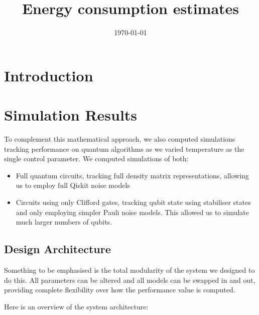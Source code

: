 \documentclass[showpacs,amsmath,amssymb,twocolumn,superscriptaddress,notitlepage,preprintnumbers,pra]{revtex4-1}
\begin{document}
\title{Energy consumption estimates}


\date{\today}







\begin{abstract}



\end{abstract}

\maketitle



\section{Introduction}

\section{Simulation Results}

To complement this mathematical approach, we also computed simulations tracking performance on quantum algorithms as we varied temperature as the single control parameter. We computed simulations of both:
\begin{itemize}[itemsep=1pt]
	\item Full quantum circuits, tracking full density matrix representations, allowing us to employ full Qiskit noise models
	\item Circuits using only Clifford gates, tracking qubit state using stabiliser states and only employing simpler Pauli noise models. This allowed us to simulate much larger numbers of qubits.
\end{itemize}

\subsection{Design Architecture}

Something to be emphasised is the total modularity of the system we designed to do this. All parameters can be altered and all models can be swapped in and out, providing complete flexibility over how the performance value is computed.

Here is an overview of the system architecture:
\end{document}
